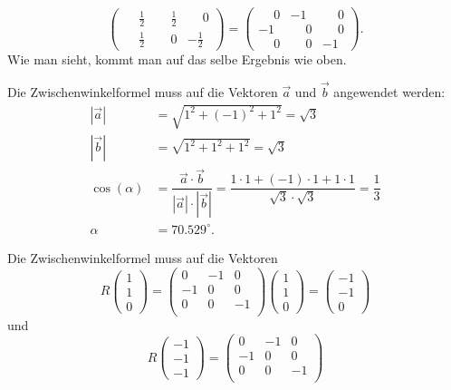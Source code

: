 \begin{loesung}
\begin{teilaufgaben}
\[\begin{pmatrix}
\phantom{-}\frac12&\phantom{-}\frac12&\phantom{-}0\\
\phantom{-}\frac12&\phantom{-}0&         - \frac12
\end{pmatrix}
=
\begin{pmatrix}
\phantom{-}0&         - 1&\phantom{-}0\\
         - 1&\phantom{-}0&\phantom{-}0\\
\phantom{-}0&\phantom{-}0&         - 1
\end{pmatrix}.
\]
Wie man sieht, kommt man auf das selbe Ergebnis wie oben.
\item
Die Zwischenwinkelformel muss auf die Vektoren $\vec a$ und
$\vec b$ angewendet werden:
\begin{align*}
|\vec a| &= \sqrt{1^2+(-1)^2+1^2} = \sqrt{3}\\
|\vec b| &= \sqrt{1^2+1^2+1^2} = \sqrt{3}\\
\cos(\alpha)&= \dfrac{\vec a\cdot \vec b}{|\vec a|\cdot |\vec b|} = \dfrac{1\cdot 1 + (-1)\cdot 1 + 1 \cdot 1}{\sqrt{3}\cdot \sqrt{3}} = \dfrac{1}{3}\\
\alpha&=70.529^\circ.
\end{align*}
\item
Die Zwischenwinkelformel muss auf die Vektoren 
\[
R\begin{pmatrix}1\\1\\0\end{pmatrix}
=
\begin{pmatrix}
0&-1& 0\\
-1&0& 0\\
0&0& -1\\
\end{pmatrix}
\begin{pmatrix}1\\1\\0\end{pmatrix}
= 
\begin{pmatrix} -1\\ -1\\ 0\end{pmatrix}
\]
und
\[
R\begin{pmatrix}-1\\-1\\-1\end{pmatrix}
=
\begin{pmatrix}
0&-1& 0\\
-1&0& 0\\
0&0& -1\\
\end{pmatrix}
\]
\end{teilaufgaben}
\end{loesung}
